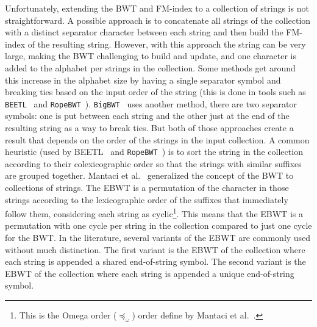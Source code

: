 Unfortunately, extending the BWT and FM-index to a collection of strings is not straightforward. A possible approach is to concatenate all strings of the collection with a distinct separator character between each string and then build the FM-index of the resulting string. However, with this approach the string can be very large, making the BWT challenging to build and update, and one character is added to the alphabet per strings in the collection. Some methods get around this increase in the alphabet size by having a single separator symbol and breaking ties based on the input order of the string (this is done in tools such as \texttt{BEETL}~\cite{Beetl} and \texttt{RopeBWT}~\cite{ropebwt2}). \texttt{BigBWT}~\cite{boucher2019prefix} uses another method, there are two separator symbols: one is put between each string and the other just at the end of the resulting string as a way to break ties. But both of those approaches create a result that depends on the order of the strings in the input collection. A common heuristic (used by {BEETL}~\cite{Beetl} and \texttt{RopeBWT}~\cite{ropebwt2}) is to sort the string in the collection according to their colexicographic order so that the strings with similar suffixes are grouped together.
Mantaci et al.~\cite{mantaci2007extension} generalized the concept of the BWT to collections of strings. The EBWT is a permutation of the character in those strings according to the lexicographic order of the suffixes that immediately follow them, considering each string as cyclic\footnote{This is the Omega order ($\preccurlyeq_\omega$) order define by Mantaci et al.~\cite{mantaci2007extension}.}. This means that the EBWT is a permutation with one cycle per string in the collection compared to just one cycle for the BWT.
In the literature, several variants of the EBWT are commonly used without much distinction. The first variant is the EBWT of the collection where each string is appended a shared end-of-string symbol. The second variant is the EBWT of the collection where each string is appended a unique end-of-string symbol. 

